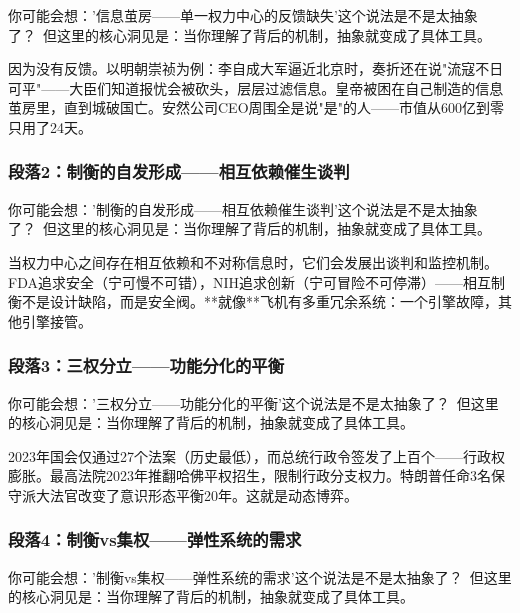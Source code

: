 \documentclass[a4paper,12pt]{book}
\newenvironment{motivation}{\begin{tcolorbox}[colback=gray!10,colframe=gray!60,title=\textit{本章动机},fonttitle=\bfseries,arc=0mm,leftrule=3mm]\small\itshape}{\end{tcolorbox}}
\begin{document}
\begin{motivation}
\begin{motivation}
\begin{motivation}
	\begin{tcolorbox}[colback=yellow!5, title=\textit{读者行为预测}]
		你可能会想：'信息茧房——单一权力中心的反馈缺失'这个说法是不是太抽象了？\ 但这里的核心洞见是：当你理解了背后的机制，抽象就变成了具体工具。
	\end{tcolorbox}

因为没有反馈。以明朝崇祯为例：李自成大军逼近北京时，奏折还在说"流寇不日可平"——大臣们知道报忧会被砍头，层层过滤信息。皇帝被困在自己制造的信息茧房里，直到城破国亡。安然公司CEO周围全是说"是"的人——市值从600亿到零只用了24天。

	\subsubsection*{段落2：制衡的自发形成——相互依赖催生谈判}

	\begin{tcolorbox}[colback=yellow!5, title=\textit{读者行为预测}]
		你可能会想：'制衡的自发形成——相互依赖催生谈判'这个说法是不是太抽象了？\ 但这里的核心洞见是：当你理解了背后的机制，抽象就变成了具体工具。
	\end{tcolorbox}

当权力中心之间存在相互依赖和不对称信息时，它们会发展出谈判和监控机制。FDA追求安全（宁可慢不可错），NIH追求创新（宁可冒险不可停滞）——相互制衡不是设计缺陷，而是安全阀。**就像**飞机有多重冗余系统：一个引擎故障，其他引擎接管。

	\subsubsection*{段落3：三权分立——功能分化的平衡}

	\begin{tcolorbox}[colback=yellow!5, title=\textit{读者行为预测}]
		你可能会想：'三权分立——功能分化的平衡'这个说法是不是太抽象了？\ 但这里的核心洞见是：当你理解了背后的机制，抽象就变成了具体工具。
	\end{tcolorbox}

2023年国会仅通过27个法案（历史最低），而总统行政令签发了上百个——行政权膨胀。最高法院2023年推翻哈佛平权招生，限制行政分支权力。特朗普任命3名保守派大法官改变了意识形态平衡20年。这就是动态博弈。

	\subsubsection*{段落4：制衡vs集权——弹性系统的需求}

	\begin{tcolorbox}[colback=yellow!5, title=\textit{读者行为预测}]
		你可能会想：'制衡vs集权——弹性系统的需求'这个说法是不是太抽象了？\ 但这里的核心洞见是：当你理解了背后的机制，抽象就变成了具体工具。
	\end{tcolorbox}


\end{motivation}
\end{motivation}
\end{motivation}
\end{document}
